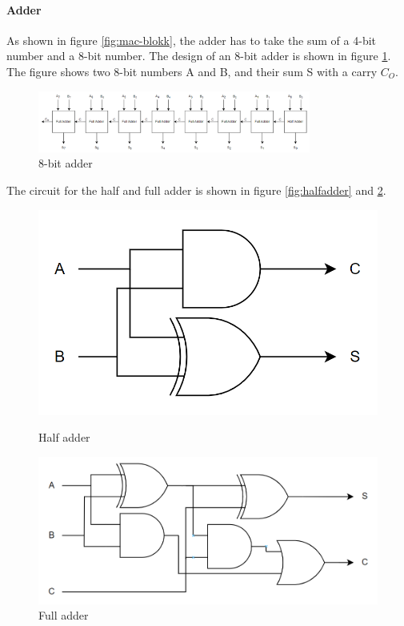 \paragraph{Adder}
As shown in figure \ref{fig:mac-blokk}, the adder has to take the sum of a 4-bit number and a 8-bit number. The design of an 8-bit adder is shown in figure \ref{fig:adder-blokk}. The figure shows two 8-bit numbers A and B, and their sum S with a carry $C_O$. 

\begin{figure}[H]
    \centering
    \includegraphics[width=0.8\textwidth]{Figures/8bitadder.png}
    \caption{8-bit adder}
    \label{fig:adder-blokk}
\end{figure}

The circuit for the half and full adder is shown in figure \ref{fig:halfadder} and \ref{fig:fulladder}.

\begin{figure}[H]
\begin{minipage}{0.4\textwidth}
    \centering
    \includegraphics[width=\linewidth]{Figures/halfadder.png}
    \caption{Half adder}
    \label{fig:halfadder}
\end{minipage}
\begin{minipage}{0.6\textwidth}
    \centering
    \includegraphics[width=\linewidth]{Figures/fulladder.png}
    \caption{Full adder}
    \label{fig:fulladder}
\end{minipage}
\end{figure}



